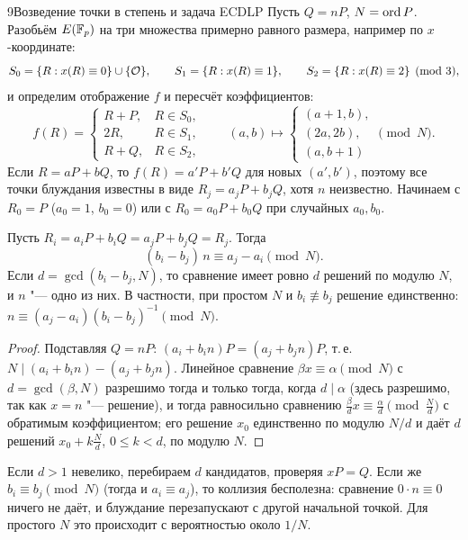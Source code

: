 \begin{lecture}{9}{Возведение точки в степень и задача ECDLP}
Пусть $Q = nP$, $N = \operatorname{ord} P$. Разобьём $E(\mathbb{F}_p)$ на три множества примерно равного размера,
например по $x$-координате:
\[
  S_0 = \{R : x(R) \equiv 0\} \cup \{\mathcal{O}\}, \qquad S_1 = \{R : x(R) \equiv 1\}, \qquad
  S_2 = \{R : x(R) \equiv 2\} \pmod 3,
\]
и определим отображение $f$ и пересчёт коэффициентов:
\[
  f(R) = \begin{cases} R + P, & R \in S_0,\\ 2R, & R \in S_1,\\ R + Q, & R \in S_2,\end{cases}
  \qquad
  (a, b) \mapsto \begin{cases} (a + 1, b),\\ (2a, 2b),\\ (a, b + 1) \end{cases} \pmod N.
\]
Если $R = aP + bQ$, то $f(R) = a'P + b'Q$ для новых $(a', b')$, поэтому все точки блуждания
известны в виде $R_j = a_j P + b_j Q$, хотя $n$ неизвестно. Начинаем с $R_0 = P$
($a_0 = 1$, $b_0 = 0$) или с $R_0 = a_0 P + b_0 Q$ при случайных $a_0, b_0$.

\begin{lemma}\label{l9:rho-congr}
Пусть $R_i = a_i P + b_i Q = a_j P + b_j Q = R_j$. Тогда
\[
  (b_i - b_j)\, n \equiv a_j - a_i \pmod N.
\]
Если $d = \gcd(b_i - b_j, N)$, то сравнение имеет ровно $d$ решений по модулю $N$, и $n$ "---
одно из них. В частности, при простом $N$ и $b_i \not\equiv b_j$ решение единственно:
$n \equiv (a_j - a_i)(b_i - b_j)^{-1} \pmod N$.
\end{lemma}

\begin{proof}
Подставляя $Q = nP$: $(a_i + b_i n) P = (a_j + b_j n) P$, т.\,е. $N \mid (a_i + b_i n) - (a_j + b_j n)$.
Линейное сравнение $\beta x \equiv \alpha \pmod N$ с $d = \gcd(\beta, N)$ разрешимо тогда и
только тогда, когда $d \mid \alpha$ (здесь разрешимо, так как $x = n$ "--- решение), и тогда
равносильно сравнению $\frac{\beta}{d} x \equiv \frac{\alpha}{d} \pmod{\frac Nd}$ с обратимым
коэффициентом; его решение $x_0$ единственно по модулю $N/d$ и даёт $d$ решений
$x_0 + k\frac Nd$, $0 \le k < d$, по модулю $N$.
\end{proof}

Если $d > 1$ невелико, перебираем $d$ кандидатов, проверяя $x P = Q$. Если же
$b_i \equiv b_j \pmod N$ (тогда и $a_i \equiv a_j$), то коллизия бесполезна: сравнение
$0 \cdot n \equiv 0$ ничего не даёт, и блуждание перезапускают с другой начальной точкой.
Для простого $N$ это происходит с вероятностью около $1/N$.


\end{lecture}
